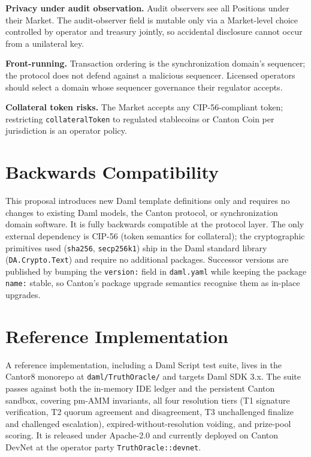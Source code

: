 \documentclass[11pt,a4paper]{article}
\begin{document}
\textbf{Privacy under audit observation.} Audit observers see all Positions under their Market. The audit-observer field is mutable only via a Market-level choice controlled by operator and treasury jointly, so accidental disclosure cannot occur from a unilateral key.

\textbf{Front-running.} Transaction ordering is the synchronization domain's sequencer; the protocol does not defend against a malicious sequencer. Licensed operators should select a domain whose sequencer governance their regulator accepts.

\textbf{Collateral token risks.} The Market accepts any CIP-56-compliant token; restricting \texttt{collateralToken} to regulated stablecoins or Canton Coin per jurisdiction is an operator policy.

\section{Backwards Compatibility}

This proposal introduces new Daml template definitions only and requires no changes to existing Daml models, the Canton protocol, or synchronization domain software. It is fully backwards compatible at the protocol layer. The only external dependency is CIP-56 (token semantics for collateral); the cryptographic primitives used (\texttt{sha256}, \texttt{secp256k1}) ship in the Daml standard library (\texttt{DA.Crypto.Text}) and require no additional packages. Successor versions are published by bumping the \texttt{version:} field in \texttt{daml.yaml} while keeping the package \texttt{name:} stable, so Canton's package upgrade semantics recognise them as in-place upgrades.

\section{Reference Implementation}
\label{sec:refimpl}

A reference implementation, including a Daml Script test suite, lives in the Cantor8 monorepo at \texttt{daml/TruthOracle/} and targets Daml SDK 3.x. The suite passes against both the in-memory IDE ledger and the persistent Canton sandbox, covering pm-AMM invariants, all four resolution tiers (T1 signature verification, T2 quorum agreement and disagreement, T3 unchallenged finalize and challenged escalation), expired-without-resolution voiding, and prize-pool scoring. It is released under Apache-2.0 and currently deployed on Canton DevNet at the operator party \texttt{TruthOracle::devnet}.
\end{document}
